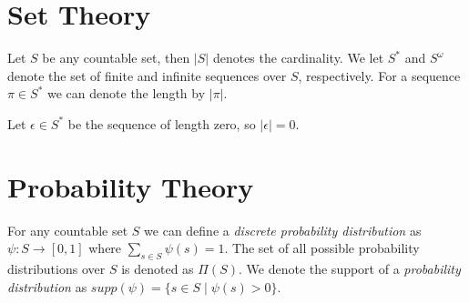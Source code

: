 \section*{Set Theory}
Let $S$ be any countable set, then $|S|$ denotes the cardinality. We let $S^*$ and $S^\omega$ denote the set of finite and infinite sequences over $S$, respectively. For a sequence $\pi\in S^*$ we can denote the length by $|\pi|$.

Let $\epsilon\in S^*$ be the sequence of length zero, so $|\epsilon|= 0$.



\section*{Probability Theory}
For any countable set $S$ we can define a \textit{discrete probability distribution} as $\psi: S\to[0,1]$ where $\sum_{s\in S} \psi(s)=1$. The set of all possible probability distributions over $S$ is denoted as $\Pi(S)$. We denote the support of a \textit{probability distribution} as $supp(\psi)=\{s\in S\mid \psi(s)>0\}$.\\






